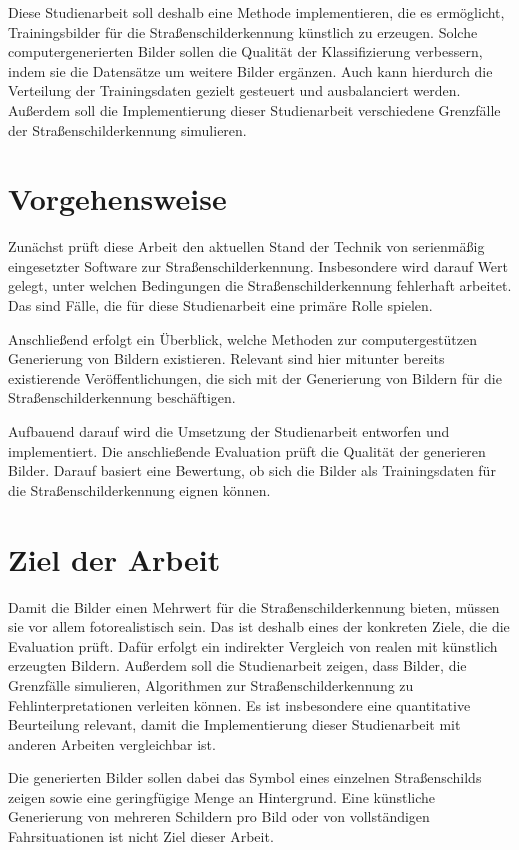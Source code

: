 Diese Studienarbeit soll deshalb eine Methode implementieren, die es ermöglicht, Trainingsbilder für die Straßenschilderkennung künstlich zu erzeugen. Solche computergenerierten Bilder sollen die Qualität der Klassifizierung verbessern, indem sie die Datensätze um weitere Bilder ergänzen. Auch kann hierdurch die Verteilung der Trainingsdaten gezielt gesteuert und ausbalanciert werden. Außerdem soll die Implementierung dieser Studienarbeit verschiedene Grenzfälle der Straßenschilderkennung simulieren.

\section{Vorgehensweise}

Zunächst prüft diese Arbeit den aktuellen Stand der Technik von serienmäßig eingesetzter Software zur Straßenschilderkennung. Insbesondere wird darauf Wert gelegt, unter welchen Bedingungen die Straßenschilderkennung fehlerhaft arbeitet. Das sind Fälle, die für diese Studienarbeit eine primäre Rolle spielen.

Anschließend erfolgt ein Überblick, welche Methoden zur computergestützen Generierung von Bildern existieren. Relevant sind hier mitunter bereits existierende Veröffentlichungen, die sich mit der Generierung von Bildern für die Straßenschilderkennung beschäftigen.

Aufbauend darauf wird die Umsetzung der Studienarbeit entworfen und implementiert. Die anschließende Evaluation prüft die Qualität der generieren Bilder. Darauf basiert eine Bewertung, ob sich die Bilder als Trainingsdaten für die Straßenschilderkennung eignen können.

\section{Ziel der Arbeit}
\label{chap:ziel-der-arbeit}

Damit die Bilder einen Mehrwert für die Straßenschilderkennung bieten, müssen sie vor allem fotorealistisch sein. Das ist deshalb eines der konkreten Ziele, die die Evaluation prüft. Dafür erfolgt ein indirekter Vergleich von realen mit künstlich erzeugten Bildern. Außerdem soll die Studienarbeit zeigen, dass Bilder, die Grenzfälle simulieren, Algorithmen zur Straßenschilderkennung zu Fehlinterpretationen verleiten können. Es ist insbesondere eine quantitative Beurteilung relevant, damit die Implementierung dieser Studienarbeit mit anderen Arbeiten vergleichbar ist. 

Die generierten Bilder sollen dabei das Symbol eines einzelnen Straßenschilds zeigen sowie eine geringfügige Menge an Hintergrund. Eine künstliche Generierung von mehreren Schildern pro Bild oder von vollständigen Fahrsituationen ist nicht Ziel dieser Arbeit.